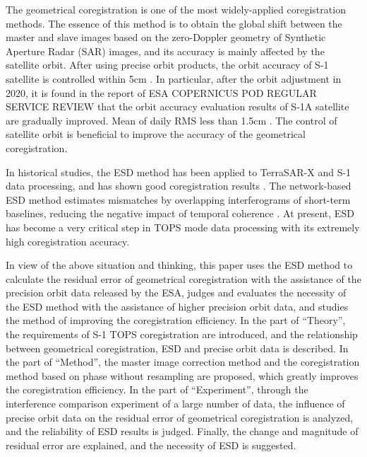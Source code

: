 \documentclass[preprint, authoryear]{elsarticle}
\begin{document}
The geometrical coregistration is one of the most widely-applied coregistration methods. The essence of this method is to obtain the global shift between the master and slave images based on the zero-Doppler geometry of Synthetic Aperture Radar (SAR) images, and its accuracy is mainly affected by the satellite orbit. After using precise orbit products, the orbit accuracy of S-1 satellite is controlled within 5cm \cite{Interferometric_Processing_of_Sentinel-1_TOPS_Data, A_Study_of_Sentinel-1_TOPS_Mode_Co-registration}. In particular, after the orbit adjustment in 2020, it is found in the report of ESA COPERNICUS POD REGULAR SERVICE REVIEW that the orbit accuracy evaluation results of S-1A satellite are gradually improved. Mean of daily RMS less than 1.5cm \cite{copernicus_review_2020.10-2020.12, copernicus_review_2021.01-2021.12, copernicus_review_2022.01-2022.12}. The control of satellite orbit is beneficial to improve the accuracy of the geometrical coregistration. \par

In historical studies, the ESD method has been applied to TerraSAR-X and S-1 data processing, and has shown good coregistration results \cite{Interferometry_with_TOPS:_coregistration_and_azimuth_shifts, Interferometric_Processing_of_Sentinel-1_TOPS_Data}. The network-based ESD method estimates mismatches by overlapping interferograms of short-term baselines, reducing the negative impact of temporal coherence \cite{A_Network-Based_Enhanced_Spectral_Diversity_Approach_for_TOPS_Time-Series_Analysis}. At present, ESD has become a very critical step in TOPS mode data processing with its extremely high coregistration accuracy.

In view of the above situation and thinking, this paper uses the ESD method to calculate the residual error of geometrical coregistration with the assistance of the precision orbit data released by the ESA, judges and evaluates the necessity of the ESD method with the assistance of higher precision orbit data, and studies the method of improving the coregistration efficiency. In the part of ``Theory'', the requirements of S-1 TOPS coregistration are introduced, and the relationship between geometrical coregistration, ESD and precise orbit data is described. In the part of ``Method'', the master image correction method and the coregistration method based on phase without resampling are proposed, which greatly improves the coregistration efficiency. In the part of ``Experiment'', through the interference comparison experiment of a large number of data, the influence of precise orbit data on the residual error of geometrical coregistration is analyzed, and the reliability of ESD results is judged. Finally, the change and magnitude of residual error are explained, and the necessity of ESD is suggested.
\end{document}
